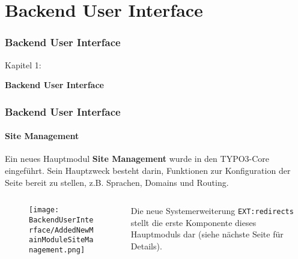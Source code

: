 %

\section{Backend User Interface}
\begin{frame}[fragile]
	\frametitle{Backend User Interface}

	\begin{center}\huge{Kapitel 1:}\end{center}
	\begin{center}\huge{\color{typo3darkgrey}\textbf{Backend User Interface}}\end{center}

\end{frame}


\begin{frame}[fragile]
	\frametitle{Backend User Interface}
	\framesubtitle{Site Management}

	Ein neues Hauptmodul \textbf{Site Management} wurde in den TYPO3-Core eingeführt.
	Sein Hauptzweck besteht darin, Funktionen zur Konfiguration der Seite bereit zu stellen,
	z.B. Sprachen, Domains und Routing.

	\begin{columns}[T]
		\begin{column}{.4\textwidth}
			\begin{figure}\vspace*{-0.4cm}
				\texttt{[image: BackendUserInterface/AddedNewMainModuleSiteManagement.png]}
			\end{figure}
		\end{column}
		\begin{column}{.5\textwidth}
			Die neue Systemerweiterung \texttt{EXT:redirects} stellt die erste Komponente dieses
			Hauptmoduls dar (siehe nächste Seite für Details).
		\end{column}
		\begin{column}{.1\textwidth}
		\end{column}
	\end{columns}

\end{frame}

